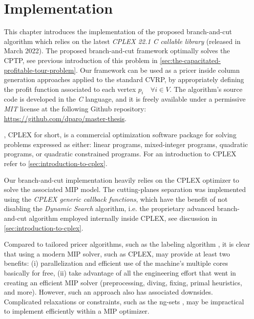 \chapter{Implementation}
\label{sec:implementation-chapter}

This chapter introduces the implementation of the proposed
branch-and-cut algorithm which relies on the
latest \textit{CPLEX 22.1 C callable library} (released in March 2022).
The proposed branch-and-cut framework optimally solves the CPTP,
see previous introduction of this problem in \cref{sec:the-capacitated-profitable-tour-problem}.
Our framework can be used as a pricer
inside column generation approaches applied to the standard CVRP,
by appropriately defining the profit function associated to each vertex $p_i \quad \forall i \in V$.
The algorithm's source code is developed in the \textit{C} language,
and it is freely available under a permissive \textit{MIT} license
at the following Github repository: \url{https://github.com/dparo/master-thesis}.

\medskip

,
CPLEX for short,
is a commercial optimization software package for solving problems expressed as either:
linear programs, mixed-integer programs, quadratic programs, or quadratic constrained programs.
For an introduction to CPLEX refer to \cref{sec:introduction-to-cplex}.

Our branch-and-cut implementation heavily relies on the CPLEX optimizer
to solve the associated MIP model.
The cutting-planes separation was implemented using the \textit{CPLEX generic callback functions},
which have the benefit of not disabling the \textit{Dynamic Search} algorithm,
i.e. the proprietary advanced branch-and-cut algorithm employed internally inside CPLEX,
see discussion in \cref{sec:introduction-to-cplex}.

Compared to tailored pricer algorithms, such as the labeling algorithm \parencite{desrochers1992, feillet2004},
it is clear that using a modern MIP solver, such as CPLEX,
may provide at least two benefits:
(i) parallelization and efficient use of the machine's multiple cores basically for free,
(ii) take advantage of all the engineering effort that went in creating an efficient MIP solver
(preprocessing, diving, fixing, primal heuristics, and more).
However, such an approach also has associated downsides.
Complicated relaxations or constraints,
such as the ng-sets \parencite{baldacci2011},
may be impractical to implement efficiently within a MIP optimizer.

